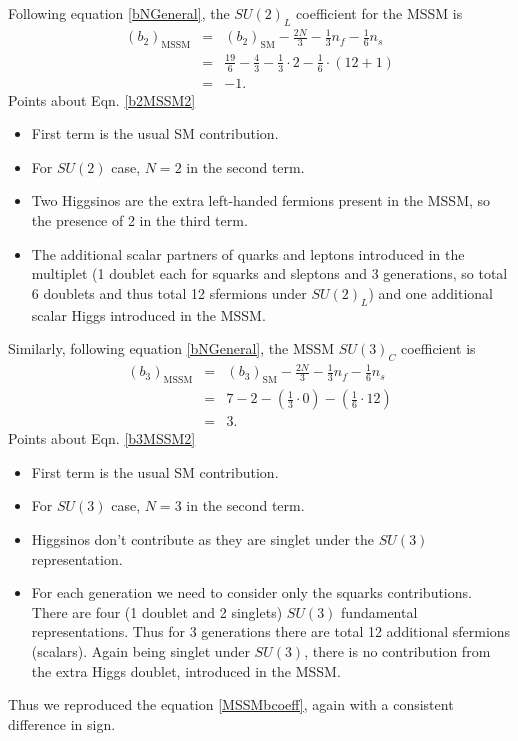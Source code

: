 \documentclass[11pt,prd,superscriptaddress,nofootinbib]{revtex4-1}
\numberwithin{equation}{section}
\newcommand{\bea}{\begin{eqnarray}}
\newcommand{\eea}{\end{eqnarray}}
\begin{document}
Following equation \ref{bNGeneral}, the $SU(2)_L$ coefficient for the MSSM is
\bea
\label{b2MSSM}
(b_2)_{\mathrm{MSSM}} &=& (b_2)_{\mathrm{SM}} -\frac{2N}{3} -\frac{1}{3}n_f -\frac{1}{6}n_s\\
&=& \frac{19}{6}-\frac{4}{3}-\frac{1}{3}\cdot 2-\frac{1}{6}\cdot(12+1)\label{b2MSSM2}\\
&=& \boxed{-1}.
\eea
Points about Eqn. \ref{b2MSSM2}
\begin{itemize}
\item First term is the usual SM contribution.
\item For $SU(2)$ case, $N=2$ in the second term.
\item Two Higgsinos are the extra left-handed fermions present in the MSSM, so the presence of 2 in the third term.
\item The additional scalar partners of quarks and leptons introduced in the multiplet (1 doublet each for squarks and sleptons and 3 generations, so total 6 doublets and thus total 12 sfermions under $SU(2)_L$) and one additional scalar Higgs introduced in the MSSM.
\end{itemize}

\noindent
Similarly, following equation \ref{bNGeneral}, the MSSM $SU(3)_C$ coefficient is
\bea
\label{b3MSSM}
(b_3)_{\mathrm{MSSM}} &=& (b_3)_{\mathrm{SM}} -\frac{2N}{3} -\frac{1}{3}n_f -\frac{1}{6}n_s\\
&=& 7 - 2 -(\frac{1}{3}\cdot 0)-(\frac{1}{6}\cdot 12)\label{b3MSSM2}\\
&=& \boxed{3}.
\eea
Points about Eqn. \ref{b3MSSM2}
\begin{itemize}
\item First term is the usual SM contribution.
\item For $SU(3)$ case, $N=3$ in the second term.
\item Higgsinos don't contribute as they are singlet under the $SU(3)$ representation.
\item For each generation we need to consider only the squarks contributions. There are four (1 doublet and 2 singlets) $SU(3)$ fundamental representations. Thus for 3 generations there are total 12 additional sfermions (scalars). Again being singlet under $SU(3)$, there is no contribution from the extra Higgs doublet, introduced in the MSSM. 
\end{itemize}

\noindent
Thus we reproduced the equation \ref{MSSMbcoeff}, again with a consistent difference in sign.

\end{document}
